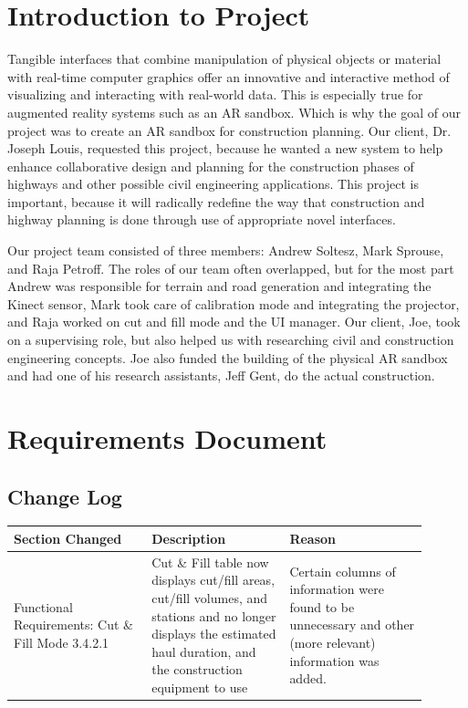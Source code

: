 \documentclass[onecolumn, draftclsnofoot,10pt, compsoc]{IEEEtran}
\begin{document}
\section{Introduction to Project}
Tangible interfaces that combine manipulation of physical objects or material with real-time computer graphics offer an innovative and interactive method of visualizing and interacting with real-world data. This is especially true for augmented reality systems such as an AR sandbox. Which is why the goal of our project was to create an AR sandbox for construction planning. Our client, Dr. Joseph Louis, requested this project, because he wanted a new system to help enhance collaborative design and planning for the construction phases of highways and other possible civil engineering applications. This project is important, because it will radically redefine the way that construction and highway planning is done through use of appropriate novel interfaces.
\par Our project team consisted of three members: Andrew Soltesz, Mark Sprouse, and Raja Petroff. The roles of our team often overlapped, but for the most part Andrew was responsible for terrain and road generation and integrating the Kinect sensor, Mark took care of calibration mode and integrating the projector, and Raja worked on cut and fill mode and the UI manager. Our client, Joe, took on a supervising role, but also helped us with researching civil and construction engineering concepts. Joe also funded the building of the physical AR sandbox and had one of his research assistants, Jeff Gent, do the actual construction.


\section{Requirements Document}
\subsection{Change Log}
\begin{tabular}{| p{0.3\linewidth}| p{0.3\linewidth}| p{0.3\linewidth}|}
\hline
 Section Changed & Description & Reason \\ \hline 
 Functional Requirements: Cut \& Fill Mode 3.4.2.1 & Cut \& Fill table now displays cut/fill areas, cut/fill volumes, and stations and no longer displays the estimated haul duration, and the construction equipment to use & Certain columns of information were found to be unnecessary and other (more relevant) information was added.\\ \hline
\end{tabular}

\end{document}
